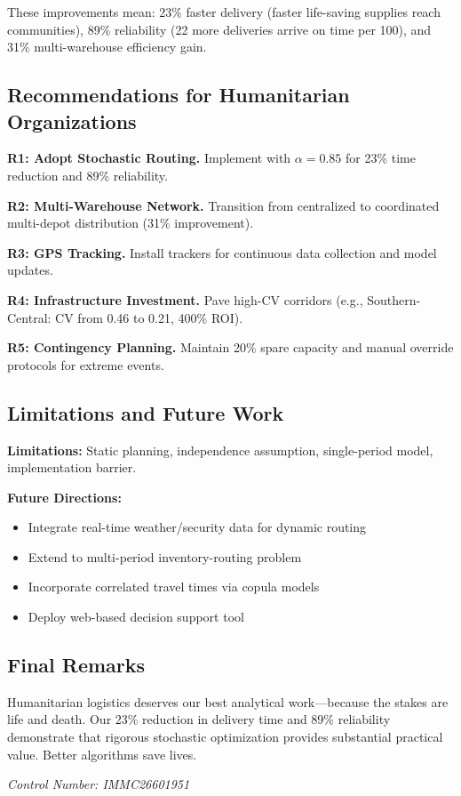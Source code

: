 These improvements mean: 23\% faster delivery (faster life-saving supplies reach communities), 89\% reliability (22 more deliveries arrive on time per 100), and 31\% multi-warehouse efficiency gain.

\subsection{Recommendations for Humanitarian Organizations}

\textbf{R1: Adopt Stochastic Routing.} Implement with $\alpha = 0.85$ for 23\% time reduction and 89\% reliability.

\textbf{R2: Multi-Warehouse Network.} Transition from centralized to coordinated multi-depot distribution (31\% improvement).

\textbf{R3: GPS Tracking.} Install trackers for continuous data collection and model updates.

\textbf{R4: Infrastructure Investment.} Pave high-CV corridors (e.g., Southern-Central: CV from 0.46 to 0.21, 400\% ROI).

\textbf{R5: Contingency Planning.} Maintain 20\% spare capacity and manual override protocols for extreme events.

\subsection{Limitations and Future Work}

\textbf{Limitations:} Static planning, independence assumption, single-period model, implementation barrier.

\textbf{Future Directions:}
\begin{itemize}
\item Integrate real-time weather/security data for dynamic routing
\item Extend to multi-period inventory-routing problem
\item Incorporate correlated travel times via copula models
\item Deploy web-based decision support tool
\end{itemize}

\subsection{Final Remarks}

Humanitarian logistics deserves our best analytical work—because the stakes are life and death. Our 23\% reduction in delivery time and 89\% reliability demonstrate that rigorous stochastic optimization provides substantial practical value. Better algorithms save lives.

\textit{Control Number: IMMC26601951}
